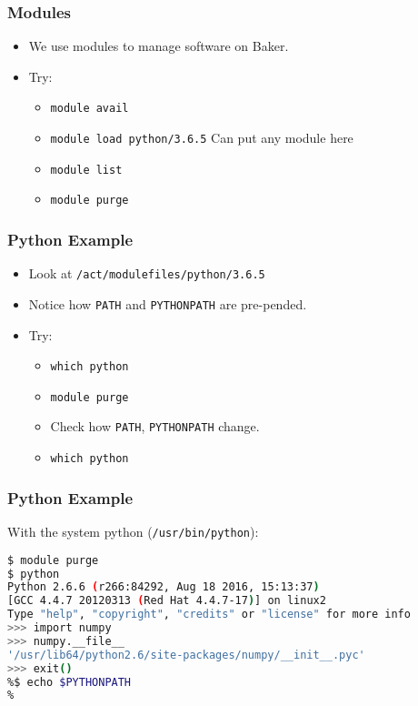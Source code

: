 \documentclass{beamer}
\newcommand{\code}[1]{\colorbox{codegray}{\texttt{#1}}}
\begin{document}
\begin{frame}
\frametitle{Modules}
\begin{itemize}
    \item We use modules to manage software on Baker.
    \pause
    \bigskip
    \item Try:
    \pause
    \begin{itemize}
        \item \code{module avail}
        \bigskip
        \pause
        \item \code{module load python/3.6.5}  Can put any module here
        \bigskip
        \pause
        \item \code{module list}
        \bigskip
        \pause
        \item \code{module purge}
    \end{itemize}
\end{itemize}
\end{frame}



\begin{frame}
\frametitle{Python Example}
\begin{itemize}
    \item Look at \code{/act/modulefiles/python/3.6.5}
    \pause
    \item Notice how \code{PATH} and \code{PYTHONPATH} are pre-pended.
    \pause
    \item Try:
    \begin{itemize}
        \item \code{which python}
        \pause
        \item \code{module purge}
        \pause
        \item Check how \code{PATH}, \code{PYTHONPATH} change.
        \pause
        \item \code{which python}
    \end{itemize}
\end{itemize}
\end{frame}


\begin{frame}[fragile]
\frametitle{Python Example}
With the system python (\code{/usr/bin/python}):
\begingroup
\scriptsize
\begin{lstlisting}[backgroundcolor = \color{codegray}, language = Bash, showstringspaces=false]
$ module purge
$ python
Python 2.6.6 (r266:84292, Aug 18 2016, 15:13:37)
[GCC 4.4.7 20120313 (Red Hat 4.4.7-17)] on linux2
Type "help", "copyright", "credits" or "license" for more info
>>> import numpy
>>> numpy.__file__
'/usr/lib64/python2.6/site-packages/numpy/__init__.pyc'
>>> exit()
%$ echo $PYTHONPATH
%
\end{lstlisting}
\endgroup
\end{frame}
\end{document}
